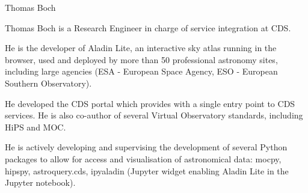 \begin{participant}[type=R,PM=2,gender=male]{Thomas Boch}




  \par Thomas Boch is a Research Engineer in charge of service integration at CDS.

  \par He is the developer of Aladin Lite, an interactive sky atlas running in the browser, used and deployed by more than 50 professional astronomy sites, including large agencies (ESA - European Space Agency, ESO - European Southern Observatory).

  \par He developed the CDS portal which provides with a single entry point to CDS services. He is also co-author of several Virtual Observatory standards, including HiPS and MOC.

  \par He is actively developing and supervising the development of several Python packages to allow for access and visualisation of astronomical data: mocpy, hipspy, astroquery.cds, ipyaladin (Jupyter widget enabling Aladin Lite in the Jupyter notebook).


\end{participant}

